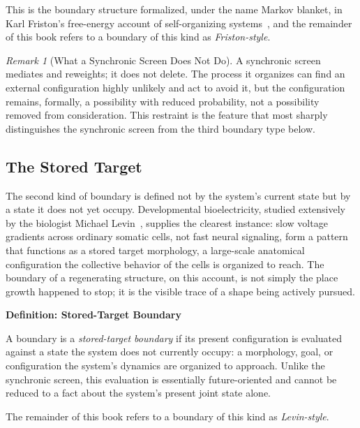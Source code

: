 \documentclass[11pt,fleqn]{book}
\numberwithin{equation}{chapter}
\newenvironment{definition}[1]
  {\begin{definitionEnv}
   \noindent\textbf{Definition: #1}\par\smallskip}
  {\end{definitionEnv}}
\theoremstyle{plain}
\theoremstyle{definition}
\theoremstyle{remark}
\newtheorem{remark}[theorem]{Remark}
\begin{document}
This is the boundary structure formalized, under the name Markov blanket, in Karl Friston's free-energy account of self-organizing systems~\cite{friston2019,kirchhoff2018}, and the remainder of this book refers to a boundary of this kind as \emph{Friston-style}.

\begin{remark}[What a Synchronic Screen Does Not Do]
A synchronic screen mediates and reweights; it does not delete. The process it organizes can find an external configuration highly unlikely and act to avoid it, but the configuration remains, formally, a possibility with reduced probability, not a possibility removed from consideration. This restraint is the feature that most sharply distinguishes the synchronic screen from the third boundary type below.
\end{remark}

\subsection{The Stored Target}

The second kind of boundary is defined not by the system's current state but by a state it does not yet occupy. Developmental bioelectricity, studied extensively by the biologist Michael Levin~\cite{levin2021,levin2023}, supplies the clearest instance: slow voltage gradients across ordinary somatic cells, not fast neural signaling, form a pattern that functions as a stored target morphology, a large-scale anatomical configuration the collective behavior of the cells is organized to reach. The boundary of a regenerating structure, on this account, is not simply the place growth happened to stop; it is the visible trace of a shape being actively pursued.

\begin{definition}{Stored-Target Boundary}
A boundary is a \emph{stored-target boundary} if its present configuration is evaluated against a state the system does not currently occupy: a morphology, goal, or configuration the system's dynamics are organized to approach. Unlike the synchronic screen, this evaluation is essentially future-oriented and cannot be reduced to a fact about the system's present joint state alone.
\end{definition}

The remainder of this book refers to a boundary of this kind as \emph{Levin-style}.
\end{document}
